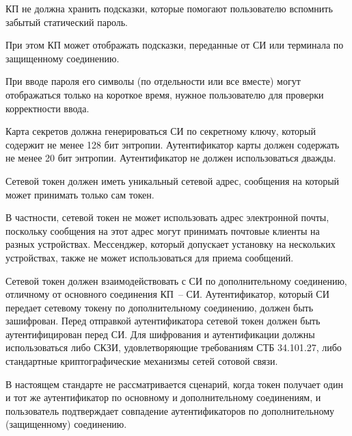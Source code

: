 КП не должна хранить подсказки, которые помогают пользователю вспомнить забытый 
статический пароль.


\begin{note*}
При этом КП может отображать подсказки, переданные от СИ или терминала 
по защищенному соединению.
\end{note*}

При вводе пароля его символы (по отдельности или все вместе)
могут отображаться только на короткое время,
нужное пользователю для проверки корректности ввода.


Карта секретов должна генерироваться СИ по секретному ключу, который содержит 
не менее 128 бит энтропии.
%
Аутентификатор карты должен содержать не менее 20 бит энтропии. 
%
Аутентификатор не должен использоваться дважды. 



Сетевой токен должен иметь уникальный сетевой адрес,
сообщения на который может принимать только сам токен.

\begin{note*}
В частности, сетевой токен не может использовать адрес электронной почты,  
поскольку сообщения на этот адрес могут принимать почтовые клиенты на разных 
устройствах. 
%
Мессенджер, который допускает установку на нескольких устройствах, также не 
может использоваться для приема сообщений.
\end{note*}

Сетевой токен должен взаимодействовать с СИ по дополнительному соединению, 
отличному от основного соединения КП~-- СИ. 
Аутентификатор, который СИ передает сетевому токену по 
дополнительному соединению, должен быть зашифрован. Перед отправкой 
аутентификатора сетевой токен должен быть аутентифицирован перед СИ.
%
Для шифрования и аутентификации должны использоваться либо СКЗИ, 
удовлетворяющие требованиям СТБ 34.101.27, либо стандартные криптографические
механизмы сетей сотовой связи.

\begin{note*}
В настоящем стандарте не рассматривается сценарий, когда токен получает
один и тот же аутентификатор по основному и дополнительному соединениям,
и пользователь подтверждает совпадение аутентификаторов по дополнительному 
(защищенному) соединению.
\end{note*}

